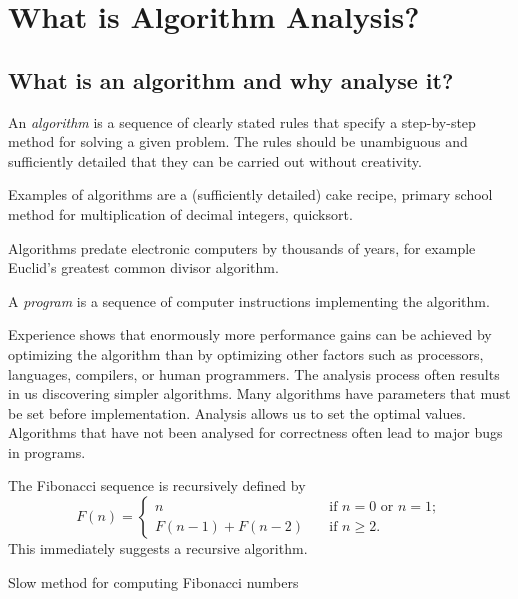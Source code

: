 \part{What is Algorithm Analysis?} \label{ch:alganal}


\chapter{What is an algorithm and why analyse it?} %

An \emph{algorithm} is a sequence of clearly stated rules that
specify a step-by-step method for solving a given problem.
The rules should be unambiguous and
sufficiently detailed that they can be carried out without creativity.

Examples of algorithms are a (sufficiently detailed) cake recipe,
primary school method for multiplication of decimal integers, quicksort.

Algorithms predate electronic computers by thousands of years, for example
Euclid's greatest common divisor algorithm.

A \emph{program} is a sequence of computer instructions implementing the algorithm.

Experience shows that enormously more performance gains can be achieved 
by optimizing the algorithm than by optimizing other factors such as
processors, languages, compilers, or human programmers.
The analysis process often results in us discovering simpler algorithms.
Many algorithms have parameters that must be set before implementation. 
Analysis allows us to set the optimal values.
Algorithms that have not been analysed for correctness often lead to 
major bugs in programs.


\begin{Example}
The Fibonacci sequence is recursively defined by 
$$
F(n) = 
  \left\{\begin{array}{ll}
	n & \quad \text{if } n = 0 \text{ or } n = 1; \\ 
    F(n - 1) + F(n - 2) & \quad \text{if } n \geq 2 \text{.}
  \end{array}
  \right.
$$
This immediately suggests a recursive algorithm.
\end{Example}

\begin{algorithm}[H]
  \caption{Slow method for computing Fibonacci numbers} 
  \label{alg:slowfib}
\begin{algorithmic}[1]
\EndIf
\EndFunction
\end{algorithmic}
\end{algorithm}

